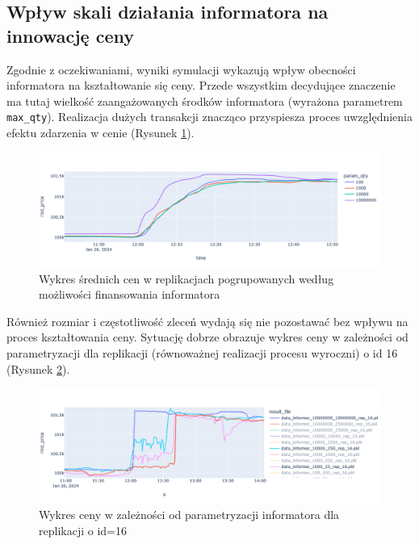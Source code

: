 \subsection{Wpływ skali działania informatora na innowację ceny}
Zgodnie z oczekiwaniami, wyniki symulacji wykazują wpływ obecności informatora na kształtowanie się ceny. Przede wszystkim decydujące znaczenie ma tutaj wielkość zaangażowanych środków informatora (wyrażona parametrem \texttt{max\_qty}). Realizacja dużych transakcji znacząco przyspiesza proces uwzględnienia efektu zdarzenia w cenie (Rysunek \ref{fig:meanpriceinn}).
\begin{center}
\begin{figure}
\begin{center}
\includegraphics[scale=0.4]{srednia_innowacja_ceny.png}
\end{center}
\caption{Wykres średnich cen w replikacjach pogrupowanych według możliwości finansowania informatora}\label{fig:meanpriceinn}
\end{figure}
\end{center}
Również rozmiar i częstotliwość zleceń wydają się nie pozostawać bez wpływu na proces kształtowania ceny. Sytuację dobrze obrazuje wykres ceny w zależności od parametryzacji dla replikacji (równoważnej realizacji procesu wyroczni) o id 16 (Rysunek \ref{fig:priceinn}).
\begin{center}
\begin{figure}
\begin{center}
\includegraphics[scale=0.4]{innowacja_ceny.png}
\end{center}
\caption{Wykres ceny w zależności od parametryzacji informatora dla replikacji o id=16}\label{fig:priceinn}
\end{figure}
\end{center}
